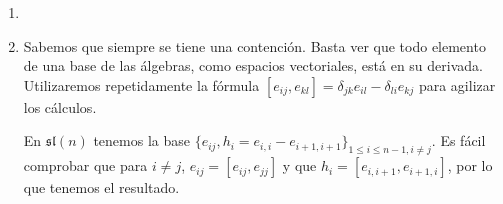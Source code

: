 \documentclass[twoside]{article}
\begin{document}
\begin{solucion}
\begin{enumerate}
\item[]
\item Sabemos que siempre se tiene una contención. Basta ver que todo elemento de una base de las álgebras, como espacios vectoriales, está en su derivada. Utilizaremos repetidamente la fórmula $[e_{ij},e_{kl}]=\delta_{jk}e_{il}-\delta_{li}e_{kj}$ para agilizar los cálculos.

En $\mathfrak{sl}(n)$ tenemos la base $\{e_{ij}, h_i=e_{i,i}-e_{i+1,i+1}\}_{1\leq i\leq n-1, i\neq j}$. Es fácil comprobar que para $i\neq j$, $e_{ij}=[e_{ij},e_{jj}]$ y que $h_i=[e_{i,i+1},e_{i+1,i}]$, por lo que tenemos el resultado.
%
%
%
% 
%
%




\end{enumerate}
\end{solucion}
\end{document}
